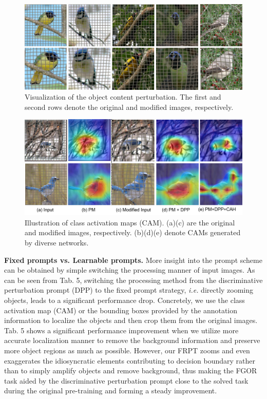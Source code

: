 \documentclass[letterpaper]{article} %
\begin{document}
\begin{figure}[!t]
\centering



    \includegraphics[width = 0.9\linewidth]{sample.png}
    \caption{Visualization of the object content perturbation. The first and second rows denote the original and modified images, respectively.}

\end{figure}
\begin{figure}[!t]
\centering
    \includegraphics[width = 0.9\linewidth]{sam.png}
    \caption{ Illustration of class activation maps (CAM). (a)(c) are the original and modified images, respectively. (b)(d)(e) denote CAMs generated by diverse networks.}


\end{figure}



\textbf{Fixed prompts vs. Learnable prompts.} More insight into the prompt scheme can be obtained by simple switching the processing manner of input images. As can be seen from Tab. 5, switching the processing method from the discriminative perturbation prompt (DPP) to the fixed prompt strategy, \textit{i.e.} directly zooming objects, leads to a significant performance drop.
Concretely, we use the class activation map (CAM) or the bounding boxes provided by the annotation information to localize the objects and then crop them from the original images. Tab. 5 shows a significant performance improvement when we utilize more accurate localization manner to remove the background information and preserve more object regions as much as possible. However, our FRPT zooms and even exaggerates the idiosyncratic elements contributing to decision boundary rather than to simply amplify objects and remove background, thus making the FGOR task aided by the discriminative perturbation prompt close to the solved task during the original pre-training and forming a steady improvement.
\end{document}
